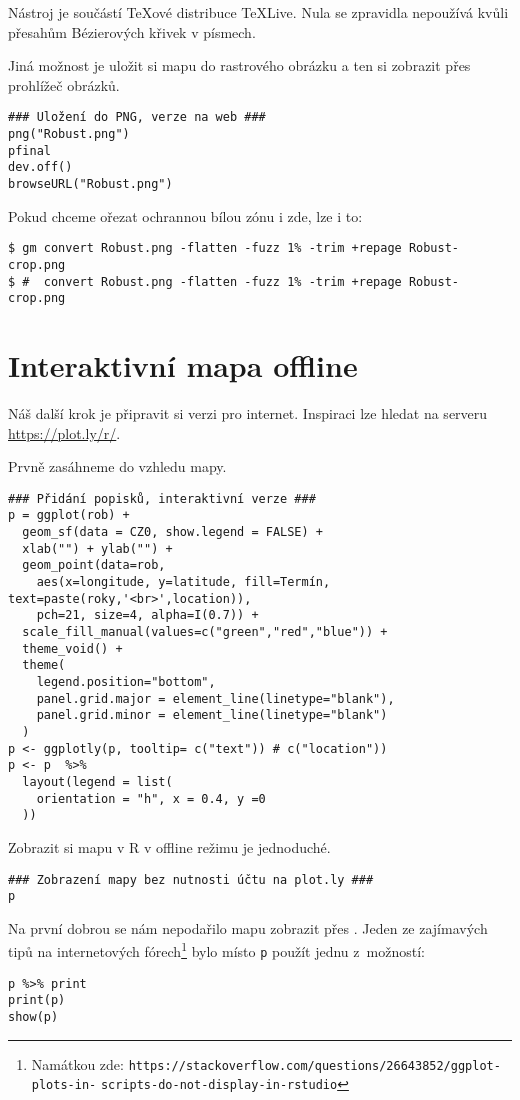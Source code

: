 Nástroj  je součástí \TeX ové distribuce \TeX Live. Nula se zpravidla nepoužívá kvůli přesahům Bézierových křivek v písmech.

Jiná možnost je uložit si mapu do rastrového obrázku a ten si zobrazit přes prohlížeč obrázků. 
\begin{lstlisting}
### Uložení do PNG, verze na web ###
png("Robust.png")
pfinal
dev.off()
browseURL("Robust.png")
\end{lstlisting}

Pokud chceme ořezat ochrannou bílou zónu i zde, lze i to:
\begin{lstlisting}[numbers=none]
$ gm convert Robust.png -flatten -fuzz 1% -trim +repage Robust-crop.png
$ #  convert Robust.png -flatten -fuzz 1% -trim +repage Robust-crop.png
\end{lstlisting}
\addtocounter{lstnumber}{-2}


\section{Interaktivní mapa offline}

Náš další krok je připravit si verzi pro internet. Inspiraci lze hledat na serveru \url{https://plot.ly/r/}.

Prvně zasáhneme do vzhledu mapy.
\begin{lstlisting}
### Přidání popisků, interaktivní verze ###
p = ggplot(rob) +
  geom_sf(data = CZ0, show.legend = FALSE) +
  xlab("") + ylab("") +
  geom_point(data=rob, 
    aes(x=longitude, y=latitude, fill=Termín, text=paste(roky,'<br>',location)),
    pch=21, size=4, alpha=I(0.7)) +
  scale_fill_manual(values=c("green","red","blue")) +
  theme_void() +
  theme(
    legend.position="bottom",
    panel.grid.major = element_line(linetype="blank"),
    panel.grid.minor = element_line(linetype="blank")
  )
p <- ggplotly(p, tooltip= c("text")) # c("location"))
p <- p  %>%
  layout(legend = list(
    orientation = "h", x = 0.4, y =0
  ))  
\end{lstlisting}

Zobrazit si mapu v R v offline režimu je jednoduché. 
\begin{lstlisting}
### Zobrazení mapy bez nutnosti účtu na plot.ly ###
p
\end{lstlisting}

Na první dobrou se nám nepodařilo mapu zobrazit přes . Jeden ze zajímavých tipů na internetových fórech\footnote{Namátkou zde: \texttt{https://stackoverflow.com/questions/26643852/ggplot-plots-in-} \texttt{scripts-do-not-display-in-rstudio}} bylo místo \texttt{p} použít jednu z~možností:
\begin{lstlisting}[numbers=none]
p %>% print
print(p)
show(p)
\end{lstlisting}
\addtocounter{lstnumber}{-3}

